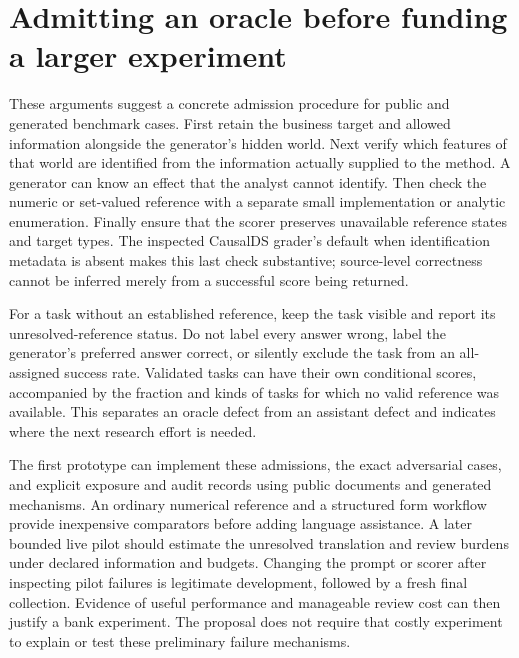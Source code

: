 \section{Admitting an oracle before funding a larger experiment}
\label{exec14:l7-oracles}

These arguments suggest a concrete admission procedure for public and
generated benchmark cases. First retain the business target and allowed
information alongside the generator's hidden world. Next verify which
features of that world are identified from the information actually supplied
to the method. A generator can know an effect that the analyst cannot
identify. Then check the numeric or set-valued reference with a separate
small implementation or analytic enumeration. Finally ensure that the
scorer preserves unavailable reference states and target types. The
inspected CausalDS grader's default when identification metadata is absent
makes this last check substantive; source-level correctness cannot be
inferred merely from a successful score being returned.
\citep{exec14_evaluation_code,exec14_l7_exposure_audit}

For a task without an established reference, keep the task visible and
report its unresolved-reference status. Do not label every answer wrong,
label the generator's preferred answer correct, or silently exclude the
task from an all-assigned success rate. Validated tasks can have their own
conditional scores, accompanied by the fraction and kinds of tasks for
which no valid reference was available. This separates an oracle defect
from an assistant defect and indicates where the next research effort is
needed.

The first prototype can implement these admissions, the exact adversarial
cases, and explicit exposure and audit records using public documents and
generated mechanisms. An ordinary numerical reference and a structured
form workflow provide inexpensive comparators before adding language
assistance. A later bounded live pilot should estimate the unresolved
translation and review burdens under declared information and budgets.
Changing the prompt or scorer after inspecting pilot failures is legitimate
development, followed by a fresh final collection. Evidence of useful
performance and manageable review cost can then justify a bank experiment.
The proposal does not require that costly experiment to explain or test
these preliminary failure mechanisms.

\label{exec14:l7-development-end}


